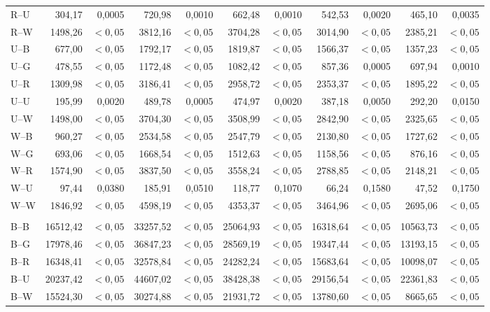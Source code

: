 {\begin{longtable}{@{}lrrrrrrrrrr@{}}
R--U & 304,17 & 0,0005 & 720,98 & 0,0010 & 662,48 & 0,0010 & 542,53 & 0,0020 & 465,10 & 0,0035 \\
R--W & 1498,26 & $<0{,}05$ & 3812,16 & $<0{,}05$ & 3704,28 & $<0{,}05$ & 3014,90 & $<0{,}05$ & 2385,21 & $<0{,}05$ \\
U--B & 677,00 & $<0{,}05$ & 1792,17 & $<0{,}05$ & 1819,87 & $<0{,}05$ & 1566,37 & $<0{,}05$ & 1357,23 & $<0{,}05$ \\
U--G & 478,55 & $<0{,}05$ & 1172,48 & $<0{,}05$ & 1082,42 & $<0{,}05$ & 857,36 & 0,0005 & 697,94 & 0,0010 \\
U--R & 1309,98 & $<0{,}05$ & 3186,41 & $<0{,}05$ & 2958,72 & $<0{,}05$ & 2353,37 & $<0{,}05$ & 1895,22 & $<0{,}05$ \\
U--U & 195,99 & 0,0020 & 489,78 & 0,0005 & 474,97 & 0,0020 & 387,18 & 0,0050 & 292,20 & 0,0150 \\
U--W & 1498,00 & $<0{,}05$ & 3704,30 & $<0{,}05$ & 3508,99 & $<0{,}05$ & 2842,90 & $<0{,}05$ & 2325,65 & $<0{,}05$ \\
W--B & 960,27 & $<0{,}05$ & 2534,58 & $<0{,}05$ & 2547,79 & $<0{,}05$ & 2130,80 & $<0{,}05$ & 1727,62 & $<0{,}05$ \\
W--G & 693,06 & $<0{,}05$ & 1668,54 & $<0{,}05$ & 1512,63 & $<0{,}05$ & 1158,56 & $<0{,}05$ & 876,16 & $<0{,}05$ \\
W--R & 1574,90 & $<0{,}05$ & 3837,50 & $<0{,}05$ & 3558,24 & $<0{,}05$ & 2788,85 & $<0{,}05$ & 2148,21 & $<0{,}05$ \\
W--U & 97,44 & 0,0380 & 185,91 & 0,0510 & 118,77 & 0,1070 & 66,24 & 0,1580 & 47,52 & 0,1750 \\
W--W & 1846,92 & $<0{,}05$ & 4598,19 & $<0{,}05$ & 4353,37 & $<0{,}05$ & 3464,96 & $<0{,}05$ & 2695,06 & $<0{,}05$ \\
\addlinespace[2pt]
\multicolumn{11}{l}{\textbf{Gramínea vs. Savana}}\\
B--B & 16512,42 & $<0{,}05$ & 33257,52 & $<0{,}05$ & 25064,93 & $<0{,}05$ & 16318,64 & $<0{,}05$ & 10563,73 & $<0{,}05$ \\
B--G & 17978,46 & $<0{,}05$ & 36847,23 & $<0{,}05$ & 28569,19 & $<0{,}05$ & 19347,44 & $<0{,}05$ & 13193,15 & $<0{,}05$ \\
B--R & 16348,41 & $<0{,}05$ & 32578,84 & $<0{,}05$ & 24282,24 & $<0{,}05$ & 15683,64 & $<0{,}05$ & 10098,07 & $<0{,}05$ \\
B--U & 20237,42 & $<0{,}05$ & 44607,02 & $<0{,}05$ & 38428,38 & $<0{,}05$ & 29156,54 & $<0{,}05$ & 22361,83 & $<0{,}05$ \\
B--W & 15524,30 & $<0{,}05$ & 30274,88 & $<0{,}05$ & 21931,72 & $<0{,}05$ & 13780,60 & $<0{,}05$ & 8665,65 & $<0{,}05$ \\

\end{longtable}}
